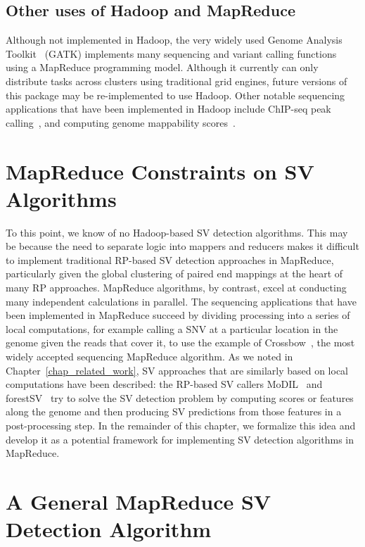 \subsection{Other uses of Hadoop and MapReduce}

Although not implemented in Hadoop, the very widely used Genome Analysis Toolkit~\cite{McKenna:2010p1051} (GATK) implements many sequencing and variant calling functions using a MapReduce programming model. Although it currently can only distribute tasks across clusters using traditional grid engines, future versions of this package may be re-implemented to use Hadoop. Other notable sequencing applications that have been implemented in Hadoop include ChIP-seq peak calling~\cite{Feng:2011p1228}, and computing genome mappability scores~\cite{Lee:2012bk}. 

\section{MapReduce Constraints on SV Algorithms}

To this point, we know of no Hadoop-based SV detection algorithms. This may be because the need to separate logic into mappers and reducers makes it difficult to implement traditional RP-based SV detection approaches in MapReduce, particularly given the global clustering of paired end mappings at the heart of many RP approaches. MapReduce algorithms, by contrast, excel at conducting many independent calculations in parallel. The sequencing applications that have been implemented in MapReduce succeed by dividing processing into a series of local computations, for example calling a SNV at a particular location in the genome given the reads that cover it, to use the example of Crossbow~\cite{Langmead:2009p1225}, the most widely accepted sequencing MapReduce algorithm. As we noted in Chapter~\ref{chap_related_work}, SV approaches that are similarly based on local computations have been described: the RP-based SV callers MoDIL~\cite{Lee:2009da} and forestSV~\cite{Michaelson:2012fj} try to solve the SV detection problem by computing scores or features along the genome and then producing SV predictions from those features in a post-processing step. In the remainder of this chapter, we formalize this idea and develop it as a potential framework for implementing SV detection algorithms in MapReduce.

\section{A General MapReduce SV Detection Algorithm}\label{section_general_algo}

